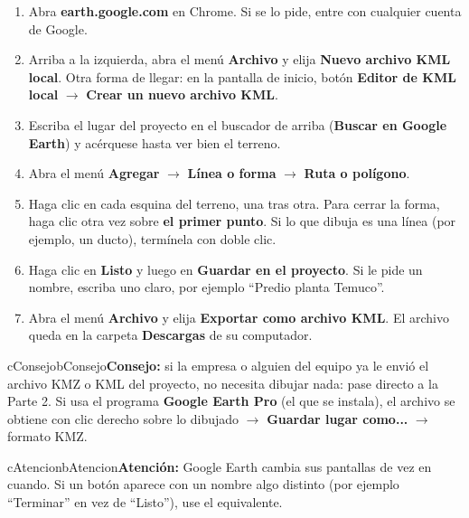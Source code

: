 \documentclass[11pt,letterpaper]{report}
\begin{document}
\begin{enumerate}
  \item Abra \textbf{earth.google.com} en Chrome. Si se lo pide, entre con cualquier cuenta de Google.
  \item Arriba a la izquierda, abra el menú \textbf{Archivo} y elija \textbf{Nuevo archivo KML local}. Otra forma de llegar: en la pantalla de inicio, botón \textbf{Editor de KML local} $\rightarrow$ \textbf{Crear un nuevo archivo KML}.
  \item Escriba el lugar del proyecto en el buscador de arriba (\textbf{Buscar en Google Earth}) y acérquese hasta ver bien el terreno.
  \item Abra el menú \textbf{Agregar} $\rightarrow$ \textbf{Línea o forma} $\rightarrow$ \textbf{Ruta o polígono}.
  \item Haga clic en cada esquina del terreno, una tras otra. Para cerrar la forma, haga clic otra vez sobre \textbf{el primer punto}. Si lo que dibuja es una línea (por ejemplo, un ducto), termínela con doble clic.
  \item Haga clic en \textbf{Listo} y luego en \textbf{Guardar en el proyecto}. Si le pide un nombre, escriba uno claro, por ejemplo “Predio planta Temuco”.
  \item Abra el menú \textbf{Archivo} y elija \textbf{Exportar como archivo KML}. El archivo queda en la carpeta \textbf{Descargas} de su computador.
\end{enumerate}
\begin{recuadro}{cConsejo}{bConsejo}\textbf{\color{bConsejo}Consejo:} si la empresa o alguien del equipo ya le envió el archivo KMZ o KML del proyecto, no necesita dibujar nada: pase directo a la Parte 2. Si usa el programa \textbf{Google Earth Pro} (el que se instala), el archivo se obtiene con clic derecho sobre lo dibujado $\rightarrow$ \textbf{Guardar lugar como...} $\rightarrow$ formato KMZ.\end{recuadro}
\begin{recuadro}{cAtencion}{bAtencion}\textbf{\color{bAtencion}Atención:} Google Earth cambia sus pantallas de vez en cuando. Si un botón aparece con un nombre algo distinto (por ejemplo “Terminar” en vez de “Listo”), use el equivalente.\end{recuadro}
\end{document}
